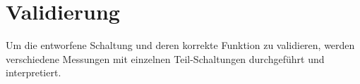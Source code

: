 \section{Validierung}
\label{sec:Validierung}

Um die entworfene Schaltung und deren korrekte Funktion zu validieren, werden verschiedene Messungen mit einzelnen Teil-Schaltungen durchgeführt und interpretiert.
